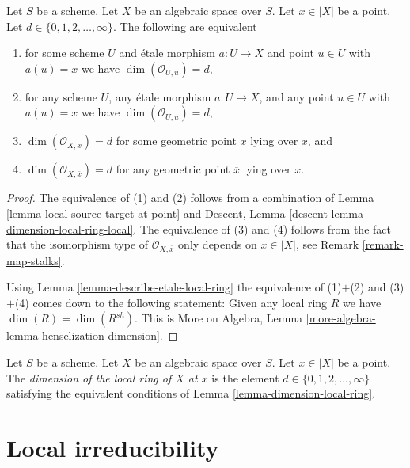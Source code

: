 \begin{lemma}
\label{lemma-dimension-local-ring}
Let $S$ be a scheme.
Let $X$ be an algebraic space over $S$.
Let $x \in |X|$ be a point.
Let $d \in \{0, 1, 2, \ldots, \infty\}$.
The following are equivalent
\begin{enumerate}
\item for some scheme $U$ and \'etale morphism $a : U \to X$ and point
$u \in U$ with $a(u) = x$ we have $\dim(\mathcal{O}_{U, u}) = d$,
\item for any scheme $U$, any \'etale morphism $a : U \to X$, and any point
$u \in U$ with $a(u) = x$ we have $\dim(\mathcal{O}_{U, u}) = d$,
\item $\dim(\mathcal{O}_{X, \overline{x}}) = d$ for some geometric
point $\overline{x}$ lying over $x$, and
\item $\dim(\mathcal{O}_{X, \overline{x}}) = d$ for any geometric
point $\overline{x}$ lying over $x$.
\end{enumerate}
\end{lemma}

\begin{proof}
The equivalence of (1) and (2) follows from a combination of
Lemma \ref{lemma-local-source-target-at-point} and
Descent, Lemma \ref{descent-lemma-dimension-local-ring-local}.
The equivalence of (3) and (4) follows from the fact that the
isomorphism type of $\mathcal{O}_{X, \overline{x}}$ only depends
on $x \in |X|$, see
Remark \ref{remark-map-stalks}.

\medskip\noindent
Using
Lemma \ref{lemma-describe-etale-local-ring}
the equivalence of (1)$+$(2) and (3)$+$(4) comes down to the
following statement: Given any local ring $R$ we have
$\dim(R) = \dim(R^{sh})$. This is
More on Algebra, Lemma \ref{more-algebra-lemma-henselization-dimension}.
\end{proof}

\begin{definition}
\label{definition-dimension-local-ring}
Let $S$ be a scheme. Let $X$ be an algebraic space over $S$.
Let $x \in |X|$ be a point.
The {\it dimension of the local ring of $X$ at $x$} is
the element $d \in \{0, 1, 2, \ldots, \infty\}$
satisfying the equivalent conditions of
Lemma \ref{lemma-dimension-local-ring}.
\end{definition}








\section{Local irreducibility}
\label{section-irreducible-local-ring}

